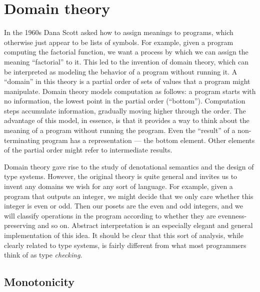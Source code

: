 \section{Domain theory}

In the 1960s Dana Scott asked how to assign meanings to programs,
which otherwise just appear to be lists of symbols.
For example, given a program computing the factorial function, we
want a process by which we can assign the meaning ``factorial'' to it.
This led to the invention of domain theory, which can be interpreted
as modeling the behavior of a program without running it.
A ``domain'' in this theory is a
partial order of sets of values that a program might manipulate. 
Domain theory models computation as follows: a program starts with no
information, the lowest point in the partial order (``bottom'').
Computation steps accumulate information, gradually moving higher through
the order. The advantage of this model, in essence, is that it provides a
way to think about the meaning of a program without running the program.
Even the ``result'' of a non-terminating program has a representation ---
the bottom element. Other elements of the partial order might refer to
intermediate results.

Domain theory gave rise to the study of denotational semantics and the
design of type systems. However, the original theory is quite general
and invites us to invent any domains we wish for any sort of language.
For example, given a program that outputs an integer, we might decide
that we only care whether this integer is even or odd. Then our posets
are the even and odd integers, and we will classify operations in the
program according to whether they are evenness-preserving and so on.
Abstract interpretation \cite{abstractinterp} is an especially
elegant and general implementation of this idea.
It should be clear that this sort of analysis, while clearly related
to type systems, is fairly different from what most programmers
think of as type \emph{checking}.


\subsection{Monotonicity}

